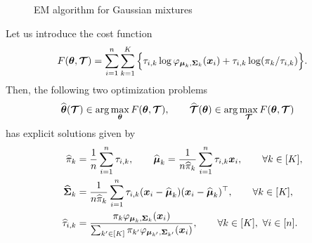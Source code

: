 \begin{figure}[ht]
\begin{center}
   \caption{EM algorithm for Gaussian mixtures}
   \label{algo:EM}
\end{center}
\end{figure}


\begin{lem}
\label{lemma1}
Let us introduce the cost function
\begin{equation}
F({\boldsymbol\theta},\boldsymbol{\mathcal T}) = \sum_{i=1}^{n} \sum_{k=1}^K \Big\{\tau_{i,k}\log\varphi_{\boldsymbol\mu_{k},\boldsymbol\Sigma_{k}}(\boldsymbol x_i)+\tau_{i,k}
    \log(\pi_k/\tau_{i,k})\Big\}.
\end{equation}
Then, the following two optimization problems
\begin{align}
\widehat{{\boldsymbol\theta}}(\boldsymbol{\mathcal T})&\in \arg\max_{{\boldsymbol\theta}} F({\boldsymbol\theta},\boldsymbol{\mathcal T}),\qquad \widehat{\boldsymbol{\mathcal T}}({\boldsymbol\theta})\in \arg\max_{\boldsymbol{\mathcal T}} F({\boldsymbol\theta},\boldsymbol{\mathcal T})
\end{align}
has explicit solutions given by
\begin{align}
\label{em-sols}
\widehat\pi_k     &= \frac1n\sum_{i=1}^n \tau_{i,k},\qquad\widehat{\boldsymbol\mu}_k = \frac1{n\widehat\pi_k}\sum_{i=1}^n \tau_{i,k}\boldsymbol x_i ,\qquad \forall k\in[K],\\
\widehat{\boldsymbol\Sigma}_k &= \frac1{n\widehat\pi_k}\sum_{i=1}^n \tau_{i,k}(\boldsymbol x_i-\widehat{\boldsymbol\mu}_k)(\boldsymbol x_i-\widehat{\boldsymbol\mu}_k)^\top,\qquad\forall k\in[K],\\
\widehat\tau_{i,k}&= \frac{\pi_k\varphi_{\boldsymbol\mu_k,\boldsymbol\Sigma_k}(\boldsymbol x_i)}{\sum_{k'\in[K]}\pi_{k'}\varphi_{\boldsymbol\mu_{k'},\boldsymbol\Sigma_{k'}}(\boldsymbol x_i)},\qquad\forall k\in[K],\ \forall i\in[n] \label{tau_ik_em}.
\end{align}
\end{lem}

